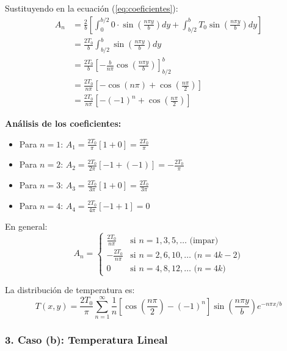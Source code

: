 \documentclass[a4paper]{article}
\begin{document}
Sustituyendo en la ecuación (\ref{eq:coeficientes}):
\begin{align}
A_n &= \frac{2}{b} \left[ \int_0^{b/2} 0 \cdot \sin\left(\frac{n\pi y}{b}\right) dy + \int_{b/2}^b T_0 \sin\left(\frac{n\pi y}{b}\right) dy \right] \\
&= \frac{2T_0}{b} \int_{b/2}^b \sin\left(\frac{n\pi y}{b}\right) dy \\
&= \frac{2T_0}{b} \left[ -\frac{b}{n\pi} \cos\left(\frac{n\pi y}{b}\right) \right]_{b/2}^b \\
&= \frac{2T_0}{n\pi} \left[ -\cos(n\pi) + \cos\left(\frac{n\pi}{2}\right) \right] \\
&= \frac{2T_0}{n\pi} \left[ -(-1)^n + \cos\left(\frac{n\pi}{2}\right) \right]
\end{align}

\textbf{Análisis de los coeficientes:}
\begin{itemize}
    \item Para $n = 1$: $A_1 = \frac{2T_0}{\pi} [1 + 0] = \frac{2T_0}{\pi}$
    \item Para $n = 2$: $A_2 = \frac{2T_0}{2\pi} [-1 + (-1)] = -\frac{2T_0}{\pi}$
    \item Para $n = 3$: $A_3 = \frac{2T_0}{3\pi} [1 + 0] = \frac{2T_0}{3\pi}$
    \item Para $n = 4$: $A_4 = \frac{2T_0}{4\pi} [-1 + 1] = 0$
\end{itemize}

En general:
\begin{equation}
A_n = \begin{cases}
\frac{2T_0}{n\pi} & \text{si } n = 1, 3, 5, \ldots \text{ (impar)} \\
-\frac{2T_0}{n\pi} & \text{si } n = 2, 6, 10, \ldots \text{ ($n = 4k-2$)} \\
0 & \text{si } n = 4, 8, 12, \ldots \text{ ($n = 4k$)}
\end{cases}
\end{equation}

La distribución de temperatura es:
\begin{equation}
\boxed{T(x, y) = \frac{2T_0}{\pi} \sum_{n=1}^{\infty} \frac{1}{n} \left[ \cos\left(\frac{n\pi}{2}\right) - (-1)^n \right] \sin\left(\frac{n\pi y}{b}\right) e^{-n\pi x/b}}
\end{equation}

\subsubsection{3. Caso (b): Temperatura Lineal}
\end{document}
